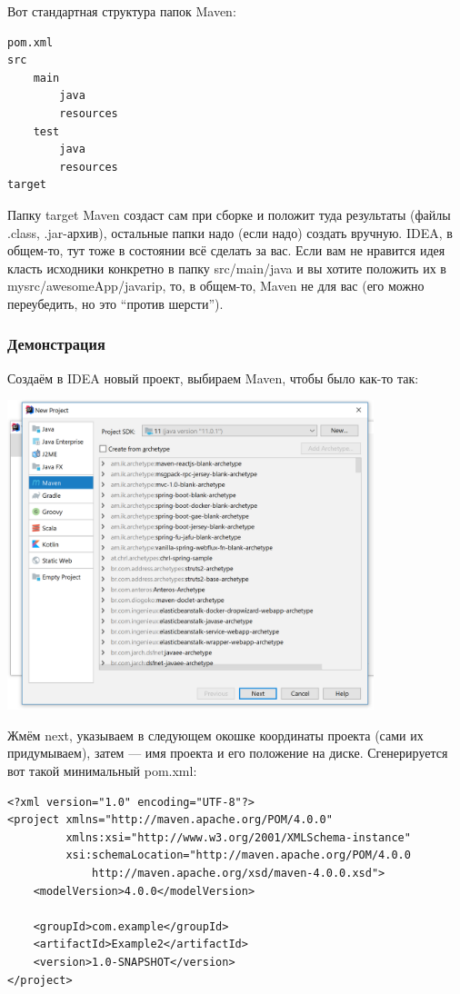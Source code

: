 \documentclass[a5paper]{article}
\begin{document}
Вот стандартная структура папок Maven:

\begin{verbatim}
pom.xml
src
    main
        java
        resources
    test
        java
        resources
target
\end{verbatim}

Папку target Maven создаст сам при сборке и положит туда результаты (файлы .class, .jar-архив), остальные папки надо (если надо) создать вручную. IDEA, в общем-то, тут тоже в состоянии всё сделать за вас. Если вам не нравится идея класть исходники конкретно в папку src/main/java и вы хотите положить их в mysrc/awesomeApp/javarip, то, в общем-то, Maven не для вас (его можно переубедить, но это ``против шерсти'').

\subsubsection{Демонстрация}

Создаём в IDEA новый проект, выбираем Maven, чтобы было как-то так:

\begin{center}
	\includegraphics[width=0.8\textwidth]{mavenProject.png}
\end{center}

Жмём next, указываем в следующем окошке координаты проекта (сами их придумываем), затем --- имя проекта и его положение на диске. Сгенерируется вот такой минимальный pom.xml:

\begin{verbatim}
<?xml version="1.0" encoding="UTF-8"?>
<project xmlns="http://maven.apache.org/POM/4.0.0"
         xmlns:xsi="http://www.w3.org/2001/XMLSchema-instance"
         xsi:schemaLocation="http://maven.apache.org/POM/4.0.0 
             http://maven.apache.org/xsd/maven-4.0.0.xsd">
    <modelVersion>4.0.0</modelVersion>

    <groupId>com.example</groupId>
    <artifactId>Example2</artifactId>
    <version>1.0-SNAPSHOT</version>
</project>
\end{verbatim}
\end{document}
